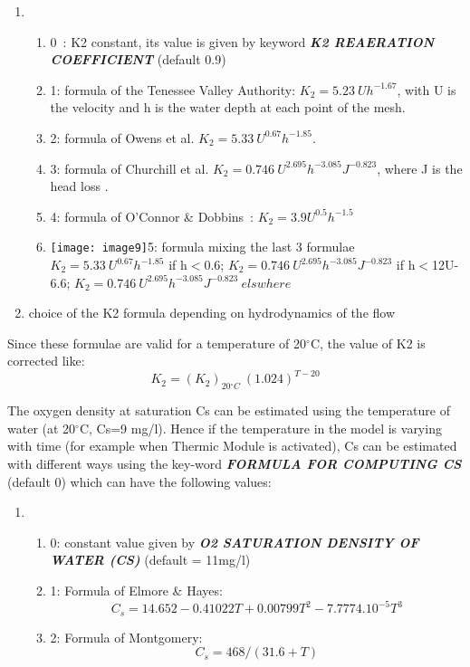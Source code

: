 \documentclass{article} %
\begin{document}
\begin{enumerate}
\item \begin{enumerate}
\item  0~: K2 constant, its value is given by keyword\textbf{ \textit{K2 REAERATION COEFFICIENT}} (default 0.9)

\item  1: formula of the Tenessee Valley Authority: $K_2=5.23\ Uh^{-1.67}$, with U is the velocity and h is the water depth at each point of the mesh.

\item  2: formula of Owens et al.  $K_2=5.33\ U^{0.67}h^{-1.85}$.

\item  3: formula of Churchill et al. $K_2=0.746\ U^{2.695}h^{-3.085}J^{-0.823}$, where J is the head loss .

\item  4: formula of O'Connor \& Dobbins~: $K_2=3.9U^{0.5}h^{-1.5}$

\item  \texttt{[image: image9]}5: formula mixing the last 3 formulae $K_2=5.33\ U^{0.67}h^{-1.85}$ if h$<$0.6; $K_2=0.746\ U^{2.695}h^{-3.085}J^{-0.823}$ if h$<$12U-6.6; $K_2=0.746\ U^{2.695}h^{-3.085}J^{-0.823}\ elswhere$
\end{enumerate}

\item  choice of the K2 formula depending on hydrodynamics of the flow
\end{enumerate}



 Since these formulae are valid for a temperature of 20${}^\circ$C, the value of K2 is corrected like:
\[K_2={\left(K_2\right)}_{20{}^\circ C}\ {\left(1.024\right)}^{T-20}\]


 The oxygen density at saturation Cs can be estimated using the temperature of water (at 20${}^\circ$C, Cs=9 mg/l). Hence if the temperature in the model is varying with time (for example when Thermic Module is activated), Cs can be estimated with different ways using the key-word \textbf{\textit{FORMULA FOR COMPUTING CS}} (default 0) which can have the following values:

\begin{enumerate}
\item \begin{enumerate}
\item  0: constant value given by \textbf{\textit{O2 SATURATION DENSITY OF WATER (CS)}} (default = 11mg/l)

\item  1: Formula of Elmore \& Hayes:
\[C_s=14.652-0.41022T+0.00799T^2-7.7774.{10}^{-5}T^3\]

\item  2: Formula of Montgomery:
\[C_s=468/(31.6+T)\]
\end{enumerate}
\end{enumerate}
\end{document}
